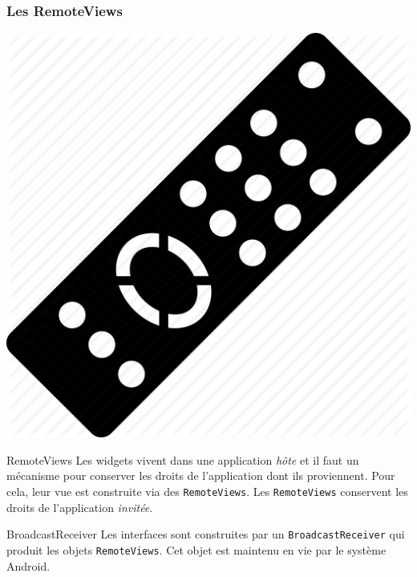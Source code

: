 \documentclass{beamer}
\begin{document}
\begin{frame}
\frametitle{Les RemoteViews}
\begin{center}
\includegraphics[scale=0.05]{remote.png}
\end{center}
\begin{block}{RemoteViews}
Les widgets vivent dans une application \emph{hôte} et il faut un mécanisme pour conserver les droits de l'application dont ils proviennent. Pour cela, leur vue est construite via des \verb!RemoteViews!. Les \verb!RemoteViews! conservent les droits de l'application \emph{invitée}.
\end{block}

\begin{block}{BroadcastReceiver}
Les interfaces sont construites par un \verb!BroadcastReceiver! qui produit les objets \verb!RemoteViews!. Cet objet est maintenu en vie par le système Android.
\end{block}
\end{frame}
\end{document}
